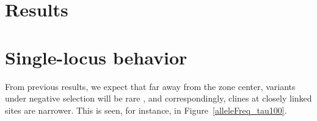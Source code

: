 \documentclass[11pt,letterpaper]{article}
\begin{document}

\section*{Results}

\section*{Single-locus behavior}

From previous results, we expect that far away from the zone center, variants under negative selection will be rare \citep[for demonstration of this theoretical result, see e.g.][]{May1975,Slatkin1973,Barton??}, and correspondingly, clines at closely linked sites are narrower.
This is seen, for instance, in Figure~\ref{alleleFreq_tau100}. 
\end{document}
